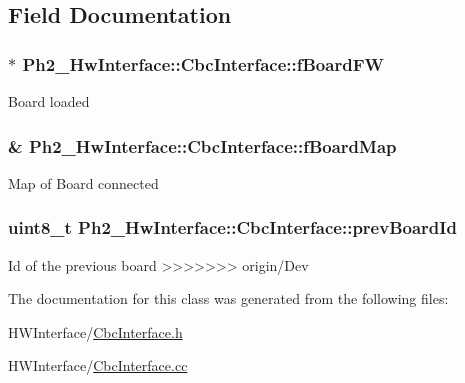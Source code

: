 \subsection{Field Documentation}
\hypertarget{class_ph2___hw_interface_1_1_cbc_interface_a8c37c0f580a1918fc11a207aff085a72}{
\subsubsection[{f\-Board\-F\-W}]{$\ast$ Ph2\-\_\-\-Hw\-Interface\-::\-Cbc\-Interface\-::f\-Board\-F\-W\hspace{0.3cm}{\ttfamily [private]}}}\label{class_ph2___hw_interface_1_1_cbc_interface_a8c37c0f580a1918fc11a207aff085a72}
Board loaded \hypertarget{class_ph2___hw_interface_1_1_cbc_interface_a0e34094468be36ee2c65e15f72178303}{
\subsubsection[{f\-Board\-Map}]{\& Ph2\-\_\-\-Hw\-Interface\-::\-Cbc\-Interface\-::f\-Board\-Map\hspace{0.3cm}{\ttfamily [private]}}}\label{class_ph2___hw_interface_1_1_cbc_interface_a0e34094468be36ee2c65e15f72178303}
Map of Board connected \hypertarget{class_ph2___hw_interface_1_1_cbc_interface_ad4c28eff1e453e9954445f9fe02c16b6}{
\subsubsection[{prev\-Board\-Id}]{\setlength{\rightskip}{0pt plus 5cm}uint8\-\_\-t Ph2\-\_\-\-Hw\-Interface\-::\-Cbc\-Interface\-::prev\-Board\-Id\hspace{0.3cm}{\ttfamily [private]}}}\label{class_ph2___hw_interface_1_1_cbc_interface_ad4c28eff1e453e9954445f9fe02c16b6}
Id of the previous board 
>>>>>>> origin/Dev

The documentation for this class was generated from the following files\-:\begin{DoxyCompactItemize}
\item 
H\-W\-Interface/\hyperlink{_cbc_interface_8h}{Cbc\-Interface.\-h}\item 
H\-W\-Interface/\hyperlink{_cbc_interface_8cc}{Cbc\-Interface.\-cc}\end{DoxyCompactItemize}
